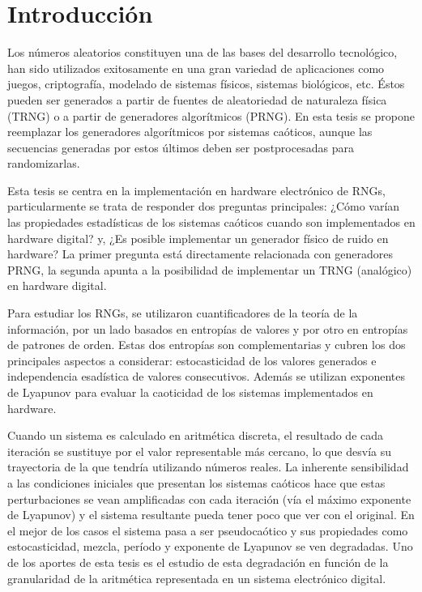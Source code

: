 \chapter{Introducción}

Los números aleatorios constituyen una de las bases del desarrollo tecnológico, han sido utilizados exitosamente en una gran variedad de aplicaciones como juegos, criptografía, modelado de sistemas físicos, sistemas biológicos, etc.
Éstos pueden ser generados a partir de fuentes de aleatoriedad de naturaleza física (TRNG) o a partir de generadores algorítmicos (PRNG).
En esta tesis se propone reemplazar los generadores algorítmicos por sistemas caóticos, aunque las secuencias generadas por estos últimos deben ser postprocesadas para randomizarlas.

Esta tesis se centra en la implementación en hardware electrónico de RNGs, particularmente se trata de responder dos preguntas principales: ¿Cómo varían las propiedades estadísticas de los sistemas caóticos cuando son implementados en hardware digital? y, ¿Es posible implementar un generador físico de ruido en hardware?
La primer pregunta está directamente relacionada con generadores PRNG, la segunda apunta a la posibilidad de implementar un TRNG (analógico) en hardware digital. 

Para estudiar los RNGs, se utilizaron cuantificadores de la teoría de la información, por un lado basados en entropías de valores y por otro en entropías de patrones de orden.
Estas dos entropías son complementarias y cubren los dos principales aspectos a considerar: estocasticidad de los valores generados e  independencia esadística de valores consecutivos.
Además se utilizan exponentes de Lyapunov para evaluar la caoticidad de los sistemas implementados en hardware.

Cuando un sistema es calculado en aritmética discreta, el resultado de cada iteración se sustituye por el valor representable más cercano, lo que desvía su trayectoria de la que tendría utilizando números reales.
La inherente sensibilidad a las condiciones iniciales que presentan los sistemas caóticos hace que estas perturbaciones se vean amplificadas con cada iteración (vía el máximo exponente de Lyapunov) y el sistema resultante pueda tener poco que ver con el original.
En el mejor de los casos el sistema pasa a ser pseudocaótico y sus propiedades como estocasticidad, mezcla, período y exponente de Lyapunov se ven degradadas.
Uno de los aportes de esta tesis es el estudio de esta degradación en función de la granularidad de la aritmética representada en un sistema electrónico digital.

